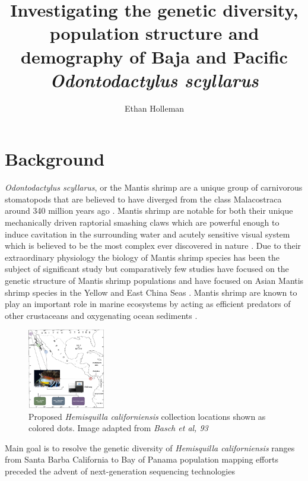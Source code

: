 \documentclass[11pt]{article}
\title{Investigating the genetic diversity, population structure and demography of Baja and Pacific \emph{Odontodactylus scyllarus}}
\date{}
\author{Ethan Holleman}
\begin{document}
\maketitle
\thispagestyle{empty}

\section{Background}

\emph{Odontodactylus scyllarus}, or the Mantis shrimp are a unique group of carnivorous stomatopods that are believed to have diverged from the class Malacostraca around 340 million years ago \cite{VanDerWal2017}. Mantis shrimp are notable for both their unique mechanically driven raptorial smashing claws which are powerful enough to induce cavitation in the surrounding water \cite{Patek2004, Patek2005} and acutely sensitive visual system which is believed to be the most complex ever discovered in nature \cite{Cronin2014, Milius2012}. Due to their extraordinary physiology the biology of Mantis shrimp species has been the subject of significant study but comparatively few studies have focused on the genetic structure of Mantis shrimp populations and have focused on Asian Mantis shrimp species in the Yellow and East China Seas \cite{Yang2018}. Mantis shrimp are known to play an important role in marine ecosystems by acting as efficient predators of other crustaceans and oxygenating ocean sediments \cite{Antony2010}. 


\begin{figure}
	\begin{center}
		\includegraphics[width=0.30\textwidth]{images/sampling_locations.png}
	\end{center}
	\caption{Proposed \emph{Hemisquilla californiensis} collection locations shown as colored dots. Image adapted from \emph{Basch et al, 93}}
\end{figure}

Main goal is to resolve the genetic diversity of \emph{Hemisquilla californiensis} ranges from Santa Barba California to Bay of Panama 
population mapping efforts preceded the advent of next-generation sequencing technologies
\end{document}
